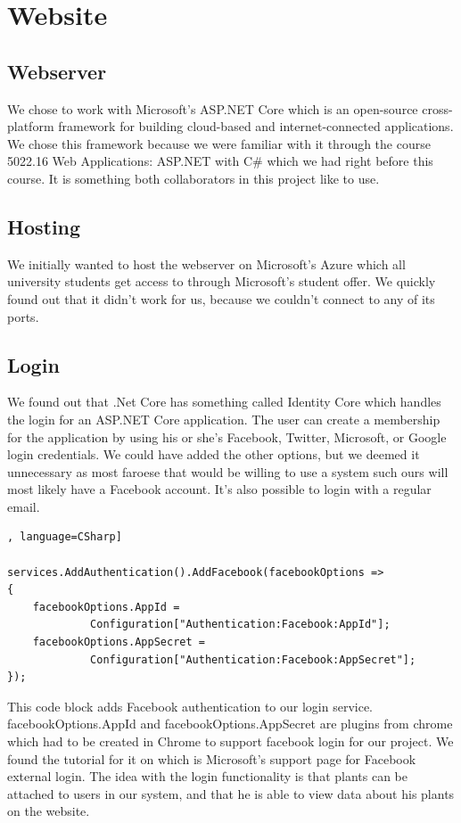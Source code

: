 \documentclass[a4paper,12pt,twoside,openright,titlepage]{book}
\begin{document}
\chapter{Website}
\section*{Webserver}
We chose to work with Microsoft's ASP.NET Core which is an open-source cross-platform framework for building cloud-based and internet-connected applications. We chose this framework because we were familiar with it through the course 5022.16 Web Applications: ASP.NET with C\# which we had right before this course. It is something both collaborators in this project like to use. 

\section{Hosting}
We initially wanted to host the webserver on Microsoft's Azure which all university students get access to through Microsoft's student offer. We quickly found out that it didn't work for us, because we couldn't connect to any of its ports. 

\section{Login}
We found out that .Net Core has something called Identity Core\cite{Identity} which handles the login for an ASP.NET Core application. The user can create a membership for the application by using his or she's Facebook, Twitter, Microsoft, or Google login credentials. We could have added the other options, but we deemed it unnecessary as most faroese that would be willing to use a system such ours will most likely have a Facebook account. It's also possible to login with a regular email.

\begin{lstlisting}, language=CSharp] 

services.AddAuthentication().AddFacebook(facebookOptions =>
{
	facebookOptions.AppId =
			 Configuration["Authentication:Facebook:AppId"];
	facebookOptions.AppSecret =
			 Configuration["Authentication:Facebook:AppSecret"];
});
\end{lstlisting}

This code block adds Facebook authentication to our login service. facebookOptions.AppId and facebookOptions.AppSecret are plugins from chrome which had to be created in Chrome to support facebook login for our project. We found the tutorial for it on \cite{FacebookLogin} which is Microsoft's support page for Facebook external login. The idea with the login functionality is that plants can be attached to users in our system, and that he is able to view data about his plants on the website.
\end{document}
